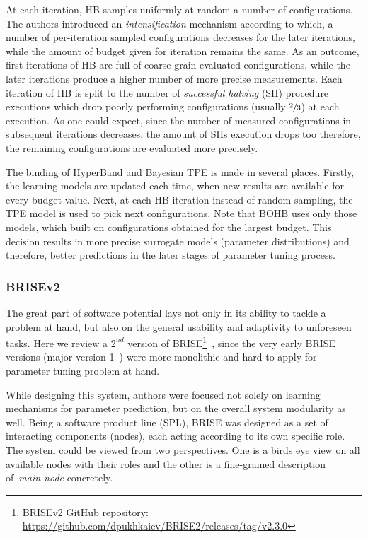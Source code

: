 At each iteration, HB samples uniformly at random a number of configurations. The authors introduced an \emph{intensification} mechanism according to which, a number of per-iteration sampled configurations decreases for the later iterations, while the amount of budget given for iteration remains the same. As an outcome, first iterations of HB are full of coarse-grain evaluated configurations, while the later iterations produce a higher number of more precise measurements. Each iteration of HB is split to the number of \emph{successful halving} (SH) procedure executions which drop poorly performing configurations (usually $\sfrac{2}{3}$) at each execution. As one could expect, since the number of measured configurations in subsequent iterations decreases, the amount of SHs execution drops too therefore, the remaining configurations are evaluated more precisely.

The binding of HyperBand and Bayesian TPE is made in several places. Firstly, the learning models are updated each time, when new results are available for every budget value. Next, at each HB iteration instead of random sampling, the TPE model is used to pick next configurations. Note that BOHB uses only those models, which built on configurations obtained for the largest budget. This decision results in more precise surrogate models (parameter distributions) and therefore, better predictions in the later stages of parameter tuning process.


\subsubsection{BRISEv2}\label{bg: brise}
The great part of software potential lays not only in its ability to tackle a problem at hand, but also on the general usability and adaptivity to unforeseen tasks.
Here we review a $2^{nd}$ version of BRISE\footnote{BRISEv2 GitHub repository: \url{https://github.com/dpukhkaiev/BRISE2/releases/tag/v2.3.0}}~\cite{brise2spl}, since the very early BRISE versions (major version 1~\cite{brise1monolite}) were more monolithic and hard to apply for parameter tuning problem at hand.

While designing this system, authors were focused not solely on learning mechanisms for parameter prediction, but on the overall system modularity as well.
Being a software product line (SPL), BRISE was designed as a set of interacting components (nodes), each acting according to its own specific role. 
The system could be viewed from two perspectives. One is a birds eye view on all available nodes with their roles and the other is a fine-grained description of~\textit{main-node} concretely.

